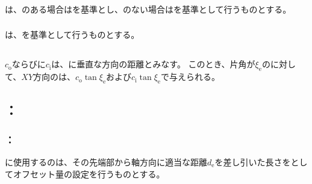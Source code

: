 \subsubsection{\EndFaceOutCChamferMillingReferencePoint}
\EndFaceOutCChamferMillingReferencePoint は、\Outcut のある場合は\OutcutCenter を基準とし、\Outcut のない場合は\EndFaceIDCenter を基準として行うものとする。

\subsubsection{\EndFaceInCChamferMillingReferencePoint}
\EndFaceInCChamferMillingReferencePoint は、\IDCenter を基準として行うものとする。


\subsection{\EndFaceCChamferMillingDimension}
\EndFaceOutCChamferLength$c_\mathrm o$ならびに\EndFaceInCChamferLength$c_\mathrm i$は、\EndFace に垂直な方向の距離とみなす。
このとき、片角が$\xi_\mathrm e$の\TaperEndMill に対して、$XY$方向の\EndFaceCChamferLength は、$c_\mathrm o\tan\xi_\mathrm e$および$c_\mathrm i\tan\xi_\mathrm e$で与えられる。


\subsection{\indexTCEndFaceCChamferMilling\nameToolCorrection：\EndFaceCChamferMilling}

\subsubsection{\indexTLCEndFaceCChamferMilling\nameTLCorrection：\EndFaceCChamferMilling}
\EndFaceCChamferMilling に使用する\indexTLTaperEndMill\nameTaperEndMill の\nameToolLength は、その先端部から軸方向に適当な距離$d_\mathrm e$を差し引いた長さを\ToolLength としてオフセット量の設定を行うものとする。

